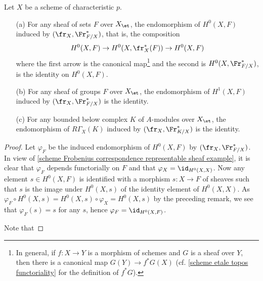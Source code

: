 \begin{proposition}\label{scheme Frobenius correspondence on cohomology}
Let $X$ be a scheme of characteristic $p$.
\begin{enumerate}
    \item[(a)] For any sheaf of sets $F$ over $X_\et$, the endomorphism of $H^0(X,F)$ induced by $(\fr_X,\Fr_{F/X}^*)$, that is, the composition
    \[H^0(X,F)\to H^0(X,\fr_X^*(F))\to H^0(X,F)\]
    where the first arrow is the canonical map\footnote{In general, if $f:X\to Y$ is a morphism of schemes and $G$ is a sheaf over $Y$, then there is a canonical map $G(Y)\to f^*G(X)$ (cf. \cref{scheme etale topos functoriality} for the definition of $f^*G$).} and the second is $H^0(X,\Fr_{F/X}^*)$, is the identity on $H^0(X,F)$.
    \item[(b)] For any sheaf of groups $F$ over $X_{\et}$, the endomorphism of $H^1(X,F)$ induced by $(\fr_X,\Fr_{F/X}^*)$ is the identity.
    \item[(c)] For any bounded below complex $K$ of $A$-modules over $X_\et$, the endomorphism of $R\Gamma_X(K)$ induced by $(\fr_X,\Fr_{K/X}^*)$ is the identity. 
\end{enumerate}
\end{proposition}
\begin{proof}
Let $\varphi_F$ be the induced endomorphism of $H^0(X,F)$ by $(\fr_X,\Fr_{F/X}^*)$. In view of \cref{scheme Frobenius correspondence representable sheaf example}, it is clear that $\varphi_F$ depends functorially on $F$ and that $\varphi_X=\id_{H^0(X,X)}$. Now any element $s\in H^0(X,F)$ is identified with a morphism $s:X\to F$ of sheaves such that $s$ is the image under $H^0(X,s)$ of the identity element of $H^0(X,X)$. As $\varphi_F\circ H^0(X,s)=H^0(X,s)\circ\varphi_X=H^0(X,s)$ by the preceding remark, we see that $\varphi_F(s)=s$ for any $s$, hence $\varphi_F=\id_{H^0(X,F)}$.\par
Note that 
\end{proof}


